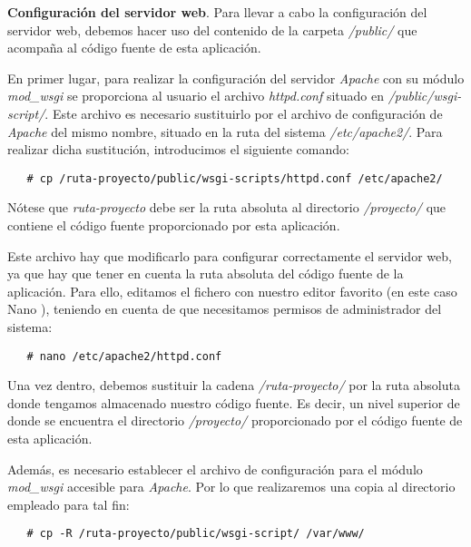 \item \textbf{Configuración del servidor web}.
   Para llevar a cabo la configuración del servidor web, debemos hacer uso del
   contenido de la carpeta \textit{/public/} que acompaña al código fuente de
   esta aplicación.

   En primer lugar, para realizar la configuración del servidor \textit{Apache}
   con su módulo \textit{mod\_wsgi} se proporciona al usuario el archivo
   \textit{httpd.conf} situado en \textit{/public/wsgi-script/}. Este archivo
   es necesario sustituirlo por el archivo de configuración de \textit{Apache}
   del mismo nombre, situado en la ruta del sistema \textit{/etc/apache2/}. Para
   realizar dicha sustitución, introducimos el siguiente comando:

   \begin{verbatim}
   # cp /ruta-proyecto/public/wsgi-scripts/httpd.conf /etc/apache2/
   \end{verbatim}

   Nótese que \textit{ruta-proyecto} debe ser la ruta absoluta al directorio
   \textit{/proyecto/} que contiene el código fuente proporcionado por esta
   aplicación.

   Este archivo hay que modificarlo para configurar correctamente el servidor
   web, ya que hay que tener en cuenta la ruta absoluta del código fuente de
   la aplicación. Para ello, editamos el fichero con nuestro editor favorito
   (en este caso Nano \cite{nano}), teniendo en cuenta de que necesitamos
   permisos de administrador del sistema:

   \begin{verbatim}
   # nano /etc/apache2/httpd.conf
   \end{verbatim}

   Una vez dentro, debemos sustituir la cadena \textit{/ruta-proyecto/} por
   la ruta absoluta donde tengamos almacenado nuestro código fuente. Es decir,
   un nivel superior de donde se encuentra el directorio \textit{/proyecto/}
   proporcionado por el código fuente de esta aplicación.

   Además, es necesario establecer el archivo de configuración para el módulo
   \textit{mod\_wsgi} accesible para \textit{Apache}. Por lo que realizaremos
   una copia al directorio empleado para tal fin:

   \begin{verbatim}
   # cp -R /ruta-proyecto/public/wsgi-script/ /var/www/
   \end{verbatim}

